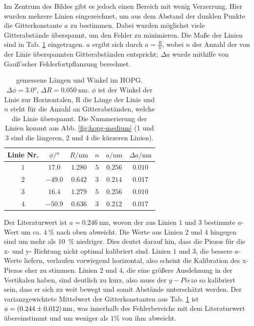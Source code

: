 \documentclass{article}
\begin{document}
Im Zentrum des Bildes gibt es jedoch einen Bereich mit wenig Verzerrung.
Hier wurden mehrere Linien eingezeichnet, um aus dem Abstand der dunklen Punkte die Gitterkonstante $a$
zu bestimmen. Dabei wurden möglichst viele Gitterabstände überspannt, um den Fehler zu minimieren.
Die Maße der Linien sind in Tab. \ref{tab:hopg-data} eingetragen. $a$ ergibt sich durch $a=\frac{R}{n}$, wobei $n$
der Anzahl der von der Linie überspannten Gitterabständen entspricht;
$\Delta a$ wurde mithilfe von Gauß'scher Fehlerfortpflanzung berechnet.

\begin{table}[h]
    \centering
    \begin{tabular}{c||c|c|c|c|c}
        Linie Nr. & $\phi/\si{\degree}$ & $R/\si{\nm}$ & $n$ & $a/\si{\nm}$ & $\Delta a/\si{\nm}$ \\
        \hline
        $1$ & $17.0 $   & $1.280$ & $5$ & $0.256$ & $0.010$ \\
        $2$ & $-49.0$	& $0.642$ & $3$ & $0.214$ & $0.017$ \\
        $3$ & $16.4	$   & $1.279$ & $5$ & $0.256$ & $0.010$ \\
        $4$ & $-50.9$	& $0.636$ & $3$ & $0.212$ & $0.017$
    \end{tabular}
    \caption{gemessene Längen und Winkel im HOPG. $\Delta\phi=\ang{3.0}$, $\Delta R = \SI{0.050}{\nm}$. $\phi$ ist der Winkel der Linie zur Horizontalen, R die Länge der Linie und $n$ steht für die Anzahl an Gitterabständen, welche die Linie überspannt.
    Die Nummerierung der Linien kommt aus Abb. \ref{fig:hopg-medium} (1 und 3 sind die längeren, 2 und 4 die kürzeren Linien).}
    \label{tab:hopg-data}
\end{table}

Der Literaturwert ist $a=\SI{0.246}{\nm}$, wovon der aus Linien $1$ und $3$ bestimmte $a$-Wert um ca. $\SI{4}{\percent}$
nach oben abweicht. Die Werte aus Linien $2$ und $4$ hingegen sind um mehr als \SI{10}{\percent} niedriger.
Dies deutet darauf hin, dass die Piezos für die x- und y- Richtung nicht optimal kalibriert sind.
Linien $1$ und $3$, die bessere $a$-Werte liefern, verlaufen vorwiegend horizontal, also scheint die Kalibration des x-Piezos
eher zu stimmen. Linien $2$ und $4$, die eine größere Ausdehnung in der Vertikalen haben, sind deutlich zu kurz,
also muss der $y-Piezo$ so kalibriert sein, dass er sich zu weit bewegt und somit Abstände unterschätzt werden.
Der varianzgewichtete Mittelwert der Gitterkonstanten aus Tab. \ref{tab:hopg-data} ist $a = \SI{0.244\pm0.012}{\nm}$,
was innerhalb des Fehlerbereichs mit dem Literaturwert übereinstimmt und um weniger als $1\%$ von ihm abweicht.
\end{document}
